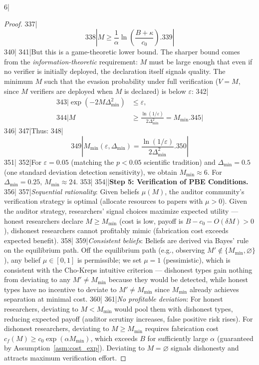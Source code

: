 6|\documentclass[12pt,a4paper]{article}
\begin{document}
\begin{proof}
337|\begin{equation}
338|    M \ge \frac{1}{\alpha}\ln\left(\frac{B + \kappa}{c_0}\right).
339|\end{equation}
340|
341|But this is a game-theoretic lower bound. The sharper bound comes from the \emph{information-theoretic} requirement: $M$ must be large enough that even if no verifier is initially deployed, the declaration itself signals quality. The minimum $M$ such that the evasion probability under full verification ($V = M$, since $M$ verifiers are deployed when $M$ is declared) is below $\varepsilon$:
342|\begin{align}
343|    \exp(-2M\Delta_{\min}^2) &\le \varepsilon, \\
344|    M &\ge \frac{\ln(1/\varepsilon)}{2\Delta_{\min}^2} = M_{\min}.
345|\end{align}
346|
347|Thus:
348|\begin{equation}\label{eq:Mmin_final}
349|    M_{\min}(\varepsilon, \Delta_{\min}) = \frac{\ln(1/\varepsilon)}{2\Delta_{\min}^2}.
350|\end{equation}
351|
352|For $\varepsilon = 0.05$ (matching the $p < 0.05$ scientific tradition) and $\Delta_{\min} = 0.5$ (one standard deviation detection sensitivity), we obtain $M_{\min} \approx 6$. For $\Delta_{\min} = 0.25$, $M_{\min} \approx 24$.
353|
354||\noindent\textbf{Step 5: Verification of PBE Conditions.}
356|
357|\textit{Sequential rationality}: Given beliefs $\mu(M)$, the auditor community's verification strategy is optimal (allocate resources to papers with $\mu > 0$). Given the auditor strategy, researchers' signal choices maximize expected utility — honest researchers declare $M \ge M_{\min}$ (cost is low, payoff is $B - c_0 - O(\delta M) > 0$), dishonest researchers cannot profitably mimic (fabrication cost exceeds expected benefit).
358|
359|\textit{Consistent beliefs}: Beliefs are derived via Bayes' rule on the equilibrium path. Off the equilibrium path (e.g., observing $M' \notin \{M_{\min}, \varnothing\}$), any belief $\mu \in [0,1]$ is permissible; we set $\mu = 1$ (pessimistic), which is consistent with the Cho-Kreps intuitive criterion — dishonest types gain nothing from deviating to any $M' \neq M_{\min}$ because they would be detected, while honest types have no incentive to deviate to $M' \neq M_{\min}$ since $M_{\min}$ already achieves separation at minimal cost.
360|
361|\textit{No profitable deviation}: For honest researchers, deviating to $M < M_{\min}$ would pool them with dishonest types, reducing expected payoff (auditor scrutiny increases, false positive risk rises). For dishonest researchers, deviating to $M \ge M_{\min}$ requires fabrication cost $c_f(M) \ge c_0 \exp(\alpha M_{\min})$, which exceeds $B$ for sufficiently large $\alpha$ (guaranteed by Assumption~\ref{asm:cost_exp}). Deviating to $M = \varnothing$ signals dishonesty and attracts maximum verification effort.

\end{proof}
\end{document}
